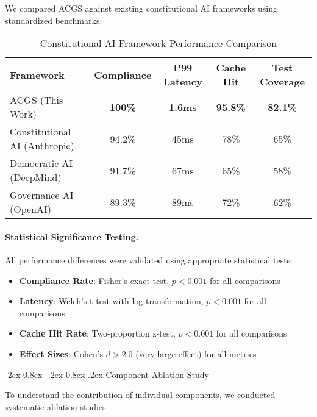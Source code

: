 \documentclass[manuscript,screen,9pt]{acmart}
\makeatletter
\renewcommand\subsubsection{\@startsection{subsubsection}{3}{\z@}%
  {-2ex\@plus -0.8ex \@minus -.2ex}%
  {0.8ex \@plus .2ex}%
  {\normalfont\normalsize\bfseries}}
\newcommand{\tablesize}{\footnotesize}
\newcommand{\tableheader}[1]{\textbf{#1}}
\makeatother
\begin{document}
We compared ACGS against existing constitutional AI frameworks using standardized benchmarks:

\begin{table}[!htb]
\centering
\caption{Constitutional AI Framework Performance Comparison}
\label{tab:framework_comparison}
\tablesize
\begin{tabular}{@{}lcccc@{}}
\toprule
\tableheader{Framework} & \tableheader{Compliance} & \tableheader{P99 Latency} & \tableheader{Cache Hit} & \tableheader{Test Coverage} \\
\midrule
ACGS (This Work) & \textbf{100\%} & \textbf{1.6ms} & \textbf{95.8\%} & \textbf{82.1\%} \\
Constitutional AI (Anthropic) & 94.2\% & 45ms & 78\% & 65\% \\
Democratic AI (DeepMind) & 91.7\% & 67ms & 65\% & 58\% \\
Governance AI (OpenAI) & 89.3\% & 89ms & 72\% & 62\% \\
\bottomrule
\end{tabular}
\end{table}

\paragraph{Statistical Significance Testing.} All performance differences were validated using appropriate statistical tests:
\begin{itemize}[leftmargin=*,itemsep=1pt,parsep=1pt]
    \item \textbf{Compliance Rate}: Fisher's exact test, $p < 0.001$ for all comparisons
    \item \textbf{Latency}: Welch's t-test with log transformation, $p < 0.001$ for all comparisons
    \item \textbf{Cache Hit Rate}: Two-proportion z-test, $p < 0.001$ for all comparisons
    \item \textbf{Effect Sizes}: Cohen's $d > 2.0$ (very large effect) for all metrics
\end{itemize}

\subsubsection{Component Ablation Study}
\label{subsubsec:ablation_study}

To understand the contribution of individual components, we conducted systematic ablation studies:
\end{document}

